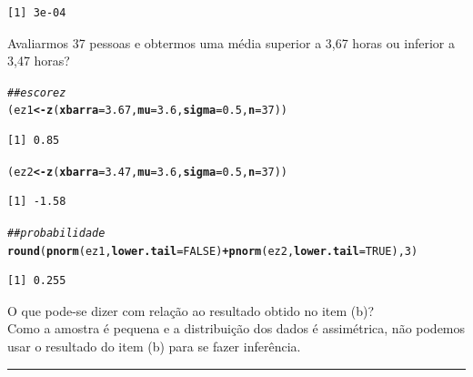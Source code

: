 \documentclass[a4paper,11pt,fleqn]{article}\usepackage[]{graphicx}\usepackage[]{color}
\makeatletter
\newcommand{\hlnum}[1]{\textcolor[rgb]{0,0,0}{#1}}%
\newcommand{\hlcom}[1]{\textcolor[rgb]{0.4,0.4,0.4}{\textit{#1}}}%
\newcommand{\hlopt}[1]{\textcolor[rgb]{0,0,0}{\textbf{#1}}}%
\newcommand{\hlstd}[1]{\textcolor[rgb]{0,0,0}{#1}}%
\newcommand{\hlkwb}[1]{\textcolor[rgb]{0,0,0}{\textbf{#1}}}%
\newcommand{\hlkwc}[1]{\textcolor[rgb]{0,0,0}{\textbf{#1}}}%
\newcommand{\hlkwd}[1]{\textcolor[rgb]{0,0,0}{\textbf{#1}}}%
\newenvironment{kframe}{%
 \def\at@end@of@kframe{}%
 \ifinner\ifhmode%
  \def\at@end@of@kframe{\end{minipage}}%
  \begin{minipage}{\columnwidth}%
 \fi\fi%
 \def\FrameCommand##1{\hskip\@totalleftmargin \hskip-\fboxsep
 \colorbox{shadecolor}{##1}\hskip-\fboxsep
     \hskip-\linewidth \hskip-\@totalleftmargin \hskip\columnwidth}%
 \MakeFramed {\advance\hsize-\width
   \@totalleftmargin\z@ \linewidth\hsize
   \@setminipage}}%
 {\par\unskip\endMakeFramed%
 \at@end@of@kframe}
\newenvironment{knitrout}{}{} %
\theoremstyle{definition}
\makeatother
\begin{document}
\begin{compactenum}[2.]
\begin{compactenum}
\begin{knitrout}
\begin{kframe}
\begin{verbatim}
[1] 3e-04
\end{verbatim}
\end{kframe}
\end{knitrout}
  \item Avaliarmos 37 pessoas e obtermos uma média superior a 3,67
    horas ou inferior a 3,47 horas?
\begin{knitrout}\small
{}\color{fgcolor}\begin{kframe}
\begin{alltt}
\hlcom{## escore z}
\hlstd{(ez1} \hlkwb{<-} \hlkwd{z}\hlstd{(}\hlkwc{xbarra} \hlstd{=} \hlnum{3.67}\hlstd{,} \hlkwc{mu} \hlstd{=} \hlnum{3.6}\hlstd{,} \hlkwc{sigma} \hlstd{=} \hlnum{0.5}\hlstd{,} \hlkwc{n} \hlstd{=} \hlnum{37}\hlstd{))}
\end{alltt}
\begin{verbatim}
[1] 0.85
\end{verbatim}
\begin{alltt}
\hlstd{(ez2} \hlkwb{<-} \hlkwd{z}\hlstd{(}\hlkwc{xbarra} \hlstd{=} \hlnum{3.47}\hlstd{,} \hlkwc{mu} \hlstd{=} \hlnum{3.6}\hlstd{,} \hlkwc{sigma} \hlstd{=} \hlnum{0.5}\hlstd{,} \hlkwc{n} \hlstd{=} \hlnum{37}\hlstd{))}
\end{alltt}
\begin{verbatim}
[1] -1.58
\end{verbatim}
\begin{alltt}
\hlcom{## probabilidade}
\hlkwd{round}\hlstd{(}\hlkwd{pnorm}\hlstd{(ez1,} \hlkwc{lower.tail} \hlstd{=} \hlnum{FALSE}\hlstd{)} \hlopt{+} \hlkwd{pnorm}\hlstd{(ez2,} \hlkwc{lower.tail} \hlstd{=} \hlnum{TRUE}\hlstd{),} \hlnum{3}\hlstd{)}
\end{alltt}
\begin{verbatim}
[1] 0.255
\end{verbatim}
\end{kframe}
\end{knitrout}
  \item O que pode-se dizer com relação ao resultado obtido no item (b)?\\
Como a amostra é pequena e a distribuição dos dados é assimétrica, não
podemos usar o resultado do item (b) para se fazer inferência.
  \end{compactenum}
\end{compactenum}

\vspace{0.3cm}
\hrule
\vspace{0.3cm}
\end{document}
